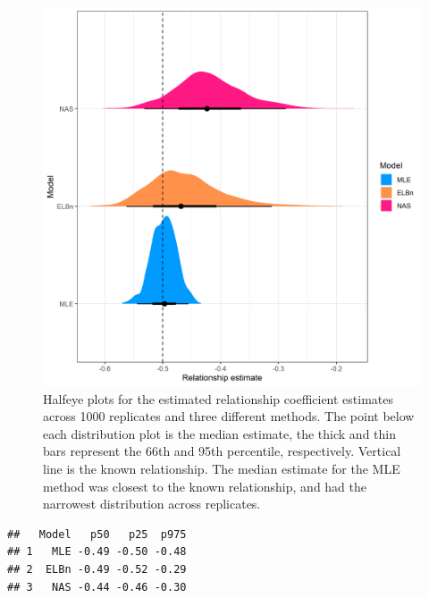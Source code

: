 \documentclass[
]{article}
\begin{document}
\begin{figure}
\centering
\includegraphics{figures/PLB_sim_relationship_density.png}
\caption{Halfeye plots for the estimated relationship coefficient
estimates across 1000 replicates and three different methods. The point
below each distribution plot is the median estimate, the thick and thin
bars represent the 66th and 95th percentile, respectively. Vertical line
is the known relationship. The median estimate for the MLE method was
closest to the known relationship, and had the narrowest distribution
across replicates.}
\end{figure}

\newpage

\begin{verbatim}
##   Model   p50   p25  p975
## 1   MLE -0.49 -0.50 -0.48
## 2  ELBn -0.49 -0.52 -0.29
## 3   NAS -0.44 -0.46 -0.30
\end{verbatim}
\end{document}
